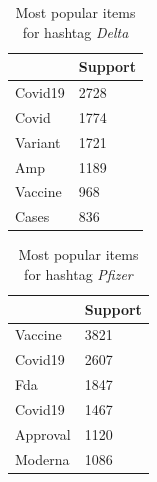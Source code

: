 \documentclass[12pt,%
               a4paper,%
               oneside,openany,%
               titlepage,%
               headinclude,footinclude,%
               BCOR5mm,%
               cleardoublepage=empty,%
               tablecaptionabove,%
               floatperchapter,
               ]{scrreprt}                 %
\begin{document}
\begin{table}[]
\caption{Most popular items for hashtag \textit{Delta}}
\begin{center}
\begin{tabular}{l|l}
        & \textbf{Support} \\ \hline
Covid19 & 2728    \\ \hline
Covid   & 1774    \\ \hline
Variant & 1721    \\ \hline
Amp     & 1189    \\ \hline
Vaccine & 968     \\ \hline
Cases   & 836
\label{POP_Delta}
\end{tabular}
\end{center}
\end{table}
\begin{table}[]
\caption{Most popular items for hashtag \textit{Pfizer}}
\begin{center}
\begin{tabular}{l|l}
         & \textbf{Support} \\ \hline
Vaccine  & 3821    \\ \hline
Covid19  & 2607    \\ \hline
Fda      & 1847    \\ \hline
Covid19  & 1467    \\ \hline
Approval & 1120    \\ \hline
Moderna  & 1086
\label{POP_Pfizer}
\end{tabular}
\end{center}
\end{table}
\end{document}
